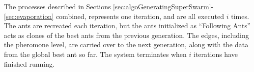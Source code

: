 
The processes described in Sections \ref{sec:algoGeneratingSuperSwarm}-\ref{sec:evaporation} combined, represents one iteration, and are all executed $i$ times. The ants are recreated each iteration, but the ants initialized as ``Following Ants'' acts as clones of the best ants from the previous generation. The edges, including the pheromone level, are carried over to the next generation, along with the data from the global best ant so far. The system terminates when $i$ iterations have finished running. 